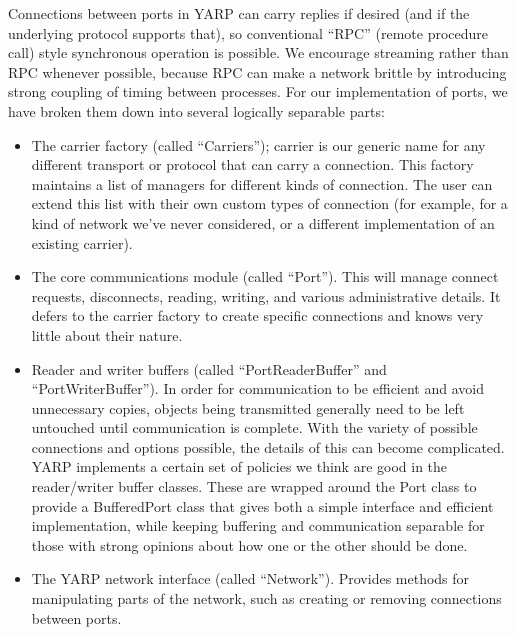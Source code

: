 Connections between ports in YARP can carry replies if desired
(and if the underlying protocol supports that), so
conventional ``RPC'' (remote procedure call) style synchronous
operation is possible.  We encourage streaming rather than RPC
whenever possible, because RPC can make a network brittle by
introducing strong coupling of timing between processes.
%
%
%
For our implementation of ports, we have broken them down into 
several logically separable parts:

\begin{itemize} \pflist

\item The carrier factory (called ``Carriers'');
carrier is our generic name for any different transport or
protocol that can carry a connection.
  This factory maintains
a list of managers for different kinds of connection.  The user
can extend this list with their own custom types of connection
(for example, for a kind of network we've never considered,
or a different implementation of an existing carrier).


\item The core communications module (called ``Port'').  This
will manage connect requests, disconnects, reading, writing,
and various administrative details.  It defers to the carrier
factory to create specific connections and knows very little
about their nature.

\item Reader and writer buffers (called ``PortReaderBuffer'' and
``PortWriterBuffer'').  In order for communication to be efficient and
avoid unnecessary copies, objects being transmitted generally need to
be left untouched until communication is complete.  With the variety
of possible connections and options possible, the details of this can
become complicated.  YARP implements a certain set of policies we
think are good in the reader/writer buffer classes.  These are wrapped
around the Port class to provide a BufferedPort class that gives both
a simple interface and efficient implementation, while keeping
buffering and communication separable for those with strong opinions
about how one or the other should be done.

\item The YARP network interface (called ``Network'').  Provides
methods for manipulating parts of the network, such as
creating or removing connections between ports.

\end{itemize}

